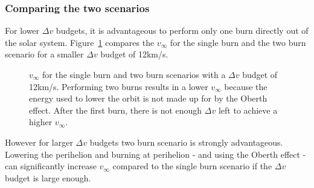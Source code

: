 \documentclass[12pt]{article} %
\begin{document}
\subsubsection{Comparing the two scenarios}

For lower $\Delta v$ budgets, it is advantageous to perform only one burn directly out of the solar system. Figure~\ref{fig:lowdv} compares the $v_{\infty}$ for the single burn and the two burn scenario for a smaller $\Delta v$ budget of 12km/s.

\begin{figure}[H]
\caption{$v_{\infty}$ for the single burn and two burn scenarios with a $\Delta v$ budget of 12km/s. Performing two burns results in a lower $v_{\infty}$ because the energy used to lower the orbit is not made up for by the Oberth effect. After the first burn, there is not enough $\Delta v$ left to achieve a higher $v_{\infty}$.}
\label{fig:lowdv}
\end{figure}

However for larger $\Delta v$ budgets two burn scenario is strongly advantageous. Lowering the perihelion and burning at perihelion - and using the Oberth effect - can significantly increase $v_{\infty}$ compared to the single burn scenario if the $\Delta v$ budget is large enough.
\end{document}
